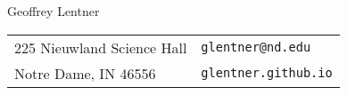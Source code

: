 
\huge
Geoffrey Lentner

\bigskip

\normalsize
\begin{tabular}{ll}
225 Nieuwland Science Hall & \small\texttt{glentner@nd.edu} \\
Notre Dame, IN 46556       & \small\texttt{glentner.github.io}
\end{tabular}

